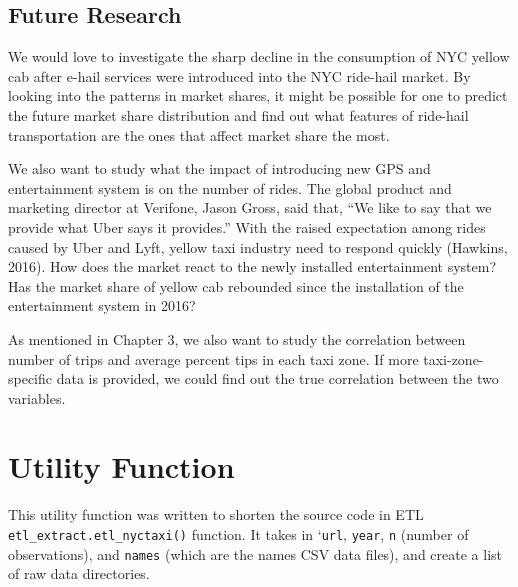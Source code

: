 \documentclass[12pt,twoside]{reedthesis}
\newenvironment{Shaded}{\begin{snugshade}}{\end{snugshade}}
\newcommand{\KeywordTok}[1]{\textcolor[rgb]{0.13,0.29,0.53}{\textbf{#1}}}
\newcommand{\DataTypeTok}[1]{\textcolor[rgb]{0.13,0.29,0.53}{#1}}
\newcommand{\StringTok}[1]{\textcolor[rgb]{0.31,0.60,0.02}{#1}}
\newcommand{\ControlFlowTok}[1]{\textcolor[rgb]{0.13,0.29,0.53}{\textbf{#1}}}
\newcommand{\OperatorTok}[1]{\textcolor[rgb]{0.81,0.36,0.00}{\textbf{#1}}}
\newcommand{\NormalTok}[1]{#1}
\theoremstyle{definition}
\theoremstyle{definition}
\theoremstyle{definition}
\theoremstyle{remark}
\begin{document}
\section{Future Research}\label{future-research}

We would love to investigate the sharp decline in the consumption of NYC
yellow cab after e-hail services were introduced into the NYC ride-hail
market. By looking into the patterns in market shares, it might be
possible for one to predict the future market share distribution and
find out what features of ride-hail transportation are the ones that
affect market share the most.

We also want to study what the impact of introducing new GPS and
entertainment system is on the number of rides. The global product and
marketing director at Verifone, Jason Gross, said that, ``We like to say
that we provide what Uber says it provides.'' With the raised
expectation among rides caused by Uber and Lyft, yellow taxi industry
need to respond quickly (Hawkins, 2016). How does the market react to
the newly installed entertainment system? Has the market share of yellow
cab rebounded since the installation of the entertainment system in
2016?

As mentioned in Chapter 3, we also want to study the correlation between
number of trips and average percent tips in each taxi zone. If more
taxi-zone-specific data is provided, we could find out the true
correlation between the two variables.

\appendix

\chapter{Utility Function}\label{utility-function}

This utility function was written to shorten the source code in ETL
\texttt{etl\_extract.etl\_nyctaxi()} function. It takes in
`\texttt{url}, \texttt{year}, \texttt{n} (number of observations), and
\texttt{names} (which are the names CSV data files), and create a list
of raw data directories.
\begin{Shaded}
\end{Shaded}
\end{document}
